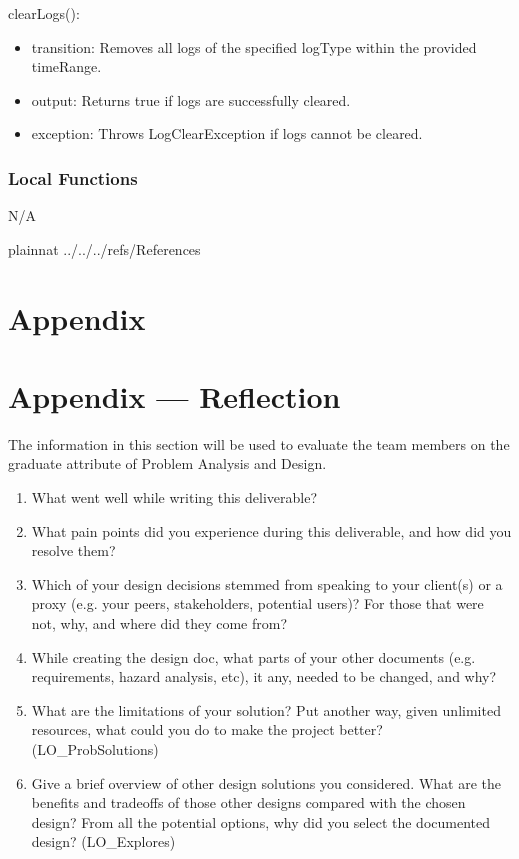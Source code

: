 \documentclass[12pt, titlepage]{article}
\begin{document}
\noindent clearLogs():
\begin{itemize}
\item transition: Removes all logs of the specified logType within the provided timeRange.
\item output: Returns true if logs are successfully cleared.
\item exception: Throws LogClearException if logs cannot be cleared.
\end{itemize}

\subsubsection{Local Functions}
N/A

\newpage

 {plainnat}
 {../../../refs/References}

\newpage

\section{Appendix} \label{Appendix}


\newpage{}

\section*{Appendix --- Reflection}


The information in this section will be used to evaluate the team members on the
graduate attribute of Problem Analysis and Design.



\begin{enumerate}
  \item What went well while writing this deliverable? 
  \item What pain points did you experience during this deliverable, and how
    did you resolve them?
  \item Which of your design decisions stemmed from speaking to your client(s)
  or a proxy (e.g. your peers, stakeholders, potential users)? For those that
  were not, why, and where did they come from?
  \item While creating the design doc, what parts of your other documents (e.g.
  requirements, hazard analysis, etc), it any, needed to be changed, and why?
  \item What are the limitations of your solution?  Put another way, given
  unlimited resources, what could you do to make the project better? (LO\_ProbSolutions)
  \item Give a brief overview of other design solutions you considered.  What
  are the benefits and tradeoffs of those other designs compared with the chosen
  design?  From all the potential options, why did you select the documented design?
  (LO\_Explores)
\end{enumerate}
\end{document}
